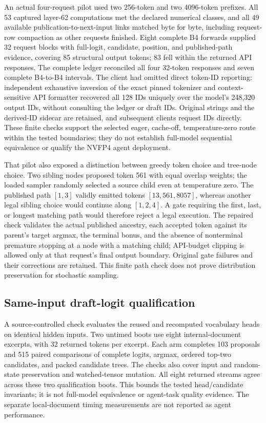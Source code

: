 \documentclass[conference]{IEEEtran}
\begin{document}
An actual four-request pilot used two 256-token and two 4096-token prefixes. All 53 captured layer-62 computations met the declared numerical classes, and all 49 available publication-to-next-input links matched byte for byte, including request-row compaction as other requests finished. Eight complete B4 forwards supplied 32 request blocks with full-logit, candidate, position, and published-path evidence, covering 85 structural output tokens; 83 fell within the returned API responses. The complete ledger reconciled all four 32-token responses and seven complete B4-to-B4 intervals. The client had omitted direct token-ID reporting: independent exhaustive inversion of the exact pinned tokenizer and context-sensitive API formatter recovered all 128 IDs uniquely over the model's 248,320 output IDs, without consulting the ledger or draft IDs. Original strings and the derived-ID sidecar are retained, and subsequent clients request IDs directly. These finite checks support the selected eager, cache-off, temperature-zero route within the tested boundaries; they do not establish full-model sequential equivalence or qualify the NVFP4 agent deployment.

That pilot also exposed a distinction between greedy token choice and tree-node choice. Two sibling nodes proposed token 561 with equal overlap weights; the loaded sampler randomly selected a source child even at temperature zero. The published path $[1,3]$ validly emitted tokens $[13,561,8057]$, whereas another legal sibling choice would continue along $[1,2,4]$. A gate requiring the first, last, or longest matching path would therefore reject a legal execution. The repaired check validates the actual published ancestry, each accepted token against its parent's target argmax, the terminal bonus, and the absence of nonterminal premature stopping at a node with a matching child; API-budget clipping is allowed only at that request's final output boundary. Original gate failures and their corrections are retained. This finite path check does not prove distribution preservation for stochastic sampling.

\subsection{Same-input draft-logit qualification}
\label{sec:reuse-qualification}
A source-controlled check evaluates the reused and recomputed vocabulary heads on identical hidden inputs. Two untimed boots use eight internal-document excerpts, with 32 returned tokens per excerpt. Each arm completes 103 proposals and 515 paired comparisons of complete logits, argmax, ordered top-two candidates, and packed candidate trees. The checks also cover input and random-state preservation and watched-tensor mutation. All eight returned streams agree across these two qualification boots. This bounds the tested head/candidate invariants; it is not full-model equivalence or agent-task quality evidence. The separate local-document timing measurements are not reported as agent performance.
\end{document}
